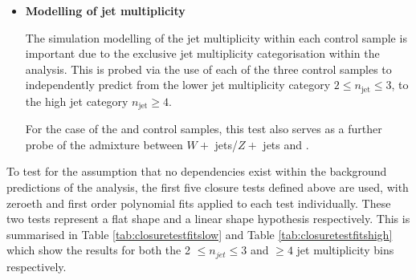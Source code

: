 \begin{itemize}
\item[]\textbf{Modelling of jet multiplicity}

The simulation modelling of the jet multiplicity within each control sample is important due to the exclusive jet multiplicity categorisation within the analysis. This is probed via the use of each of the three control samples to independently predict from the lower jet multiplicity category $2 \leq n_{\text{jet}} \leq 3$, to the high jet category $n_{\text{jet}} \geq 4$. 

For the case of the \mupjets and \dimupjets control samples, this test also serves as a further probe of the admixture between $W +$ jets/$Z +$ jets and \ttbar. 
\end{itemize}

To test for the assumption that no \theht dependencies exist within the background predictions of the analysis, the first five closure tests defined above are used, with zeroeth and first order polynomial fits applied to each test individually. These two tests represent a flat shape and a linear shape hypothesis respectively. This is summarised in Table \ref{tab:closuretestfitslow} and Table \ref{tab:closuretestfitshigh} which show the results for both the 2 $\leq n_{jet} \leq 3$ and $\geq 4$ jet multiplicity bins respectively.

